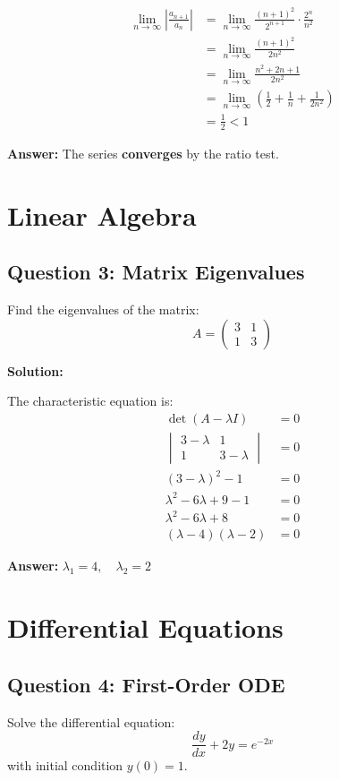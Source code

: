 \documentclass[12pt]{article}
\begin{document}
\begin{align*}
    \lim_{n \to \infty} \left|\frac{a_{n+1}}{a_n}\right| &= \lim_{n \to \infty} \frac{(n+1)^2}{2^{n+1}} \cdot \frac{2^n}{n^2} \\
    &= \lim_{n \to \infty} \frac{(n+1)^2}{2n^2} \\
    &= \lim_{n \to \infty} \frac{n^2 + 2n + 1}{2n^2} \\
    &= \lim_{n \to \infty} \left(\frac{1}{2} + \frac{1}{n} + \frac{1}{2n^2}\right) \\
    &= \frac{1}{2} < 1
\end{align*}

\textbf{Answer:} The series \textbf{converges} by the ratio test.

\section{Linear Algebra}

\subsection*{Question 3: Matrix Eigenvalues}
Find the eigenvalues of the matrix:
$$A = \begin{pmatrix} 3 & 1 \\ 1 & 3 \end{pmatrix}$$

\textbf{Solution:}

The characteristic equation is:
\begin{align*}
    \det(A - \lambda I) &= 0 \\
    \begin{vmatrix} 3-\lambda & 1 \\ 1 & 3-\lambda \end{vmatrix} &= 0 \\
    (3-\lambda)^2 - 1 &= 0 \\
    \lambda^2 - 6\lambda + 9 - 1 &= 0 \\
    \lambda^2 - 6\lambda + 8 &= 0 \\
    (\lambda - 4)(\lambda - 2) &= 0
\end{align*}

\textbf{Answer:} $\boxed{\lambda_1 = 4, \quad \lambda_2 = 2}$

\section{Differential Equations}

\subsection*{Question 4: First-Order ODE}
Solve the differential equation:
$$\frac{dy}{dx} + 2y = e^{-2x}$$
with initial condition $y(0) = 1$.
\end{document}
